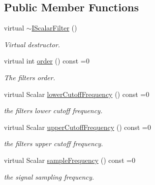 \subsection*{Public Member Functions}
\begin{DoxyCompactItemize}
\item 
virtual \hyperlink{classow__core_1_1IScalarFilter_a0ea84906e8f55de674e782939b83505b}{$\sim$\+I\+Scalar\+Filter} ()\hypertarget{classow__core_1_1IScalarFilter_a0ea84906e8f55de674e782939b83505b}{}\label{classow__core_1_1IScalarFilter_a0ea84906e8f55de674e782939b83505b}

\begin{DoxyCompactList}\small\item\em Virtual destructor. \end{DoxyCompactList}\item 
virtual int \hyperlink{classow__core_1_1IScalarFilter_aff261dab85204d7915d7f0519c67debf}{order} () const =0
\begin{DoxyCompactList}\small\item\em The filters order. \end{DoxyCompactList}\item 
virtual Scalar \hyperlink{classow__core_1_1IScalarFilter_a31cdbad1e63f1be755f1447e3cefb330}{lower\+Cutoff\+Frequency} () const =0\hypertarget{classow__core_1_1IScalarFilter_a31cdbad1e63f1be755f1447e3cefb330}{}\label{classow__core_1_1IScalarFilter_a31cdbad1e63f1be755f1447e3cefb330}

\begin{DoxyCompactList}\small\item\em the filters lower cutoff frequency. \end{DoxyCompactList}\item 
virtual Scalar \hyperlink{classow__core_1_1IScalarFilter_a5a79826a092d65ed58275819e6e9b40a}{upper\+Cutoff\+Frequency} () const =0\hypertarget{classow__core_1_1IScalarFilter_a5a79826a092d65ed58275819e6e9b40a}{}\label{classow__core_1_1IScalarFilter_a5a79826a092d65ed58275819e6e9b40a}

\begin{DoxyCompactList}\small\item\em the filters upper cutoff frequency. \end{DoxyCompactList}\item 
virtual Scalar \hyperlink{classow__core_1_1IScalarFilter_a77f8e6a116998991c8d97f8d668fcdfc}{sample\+Frequency} () const =0\hypertarget{classow__core_1_1IScalarFilter_a77f8e6a116998991c8d97f8d668fcdfc}{}\label{classow__core_1_1IScalarFilter_a77f8e6a116998991c8d97f8d668fcdfc}

\begin{DoxyCompactList}\small\item\em the signal sampling frequency. \end{DoxyCompactList}\end{DoxyCompactItemize}


